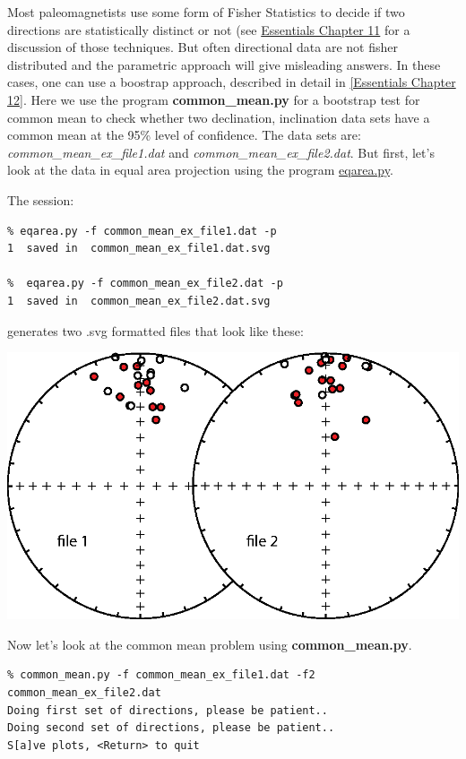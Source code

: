 \documentclass[11pt]{book}
\begin{document}
{{{Most paleomagnetists use some form of Fisher Statistics to decide if two directions are statistically distinct or not (see \href{http://magician.ucsd.edu/Essentials_2/WebBook2ch11.html#ch11}{Essentials Chapter 11} for a discussion of those techniques.  But often directional data are not fisher distributed and the parametric approach will give misleading answers.  In these cases, one can use a boostrap approach, described in detail in \href{http://magician.ucsd.edu/Essentials_2/WebBook2ch12.html#ch12}{[Essentials Chapter 12]}.  Here we
use the program {\bf common\_mean.py} for a bootstrap test for common mean to check whether two declination, inclination data sets have a common mean at the 95\% level of confidence.    The data sets are: {\it common\_mean\_ex\_file1.dat } and {\it common\_mean\_ex\_file2.dat}.  But first, let's look at the data in equal area projection  using the program \href{#eqarea.py}{eqarea.py}.

The session: 
\begin{verbatim}
% eqarea.py -f common_mean_ex_file1.dat -p
1  saved in  common_mean_ex_file1.dat.svg

%  eqarea.py -f common_mean_ex_file2.dat -p
1  saved in  common_mean_ex_file2.dat.svg
\end{verbatim} 

\noindent generates two .svg formatted files that look like these:

{%
  \includegraphics[width=15cm]{EPSfiles/common-mean-eq.eps}}
  
Now let's look at the common mean problem using {\bf common\_mean.py}. 

\begin{verbatim}
% common_mean.py -f common_mean_ex_file1.dat -f2 common_mean_ex_file2.dat
Doing first set of directions, please be patient..
Doing second set of directions, please be patient..
S[a]ve plots, <Return> to quit
\end{verbatim}

}}}
\end{document}
